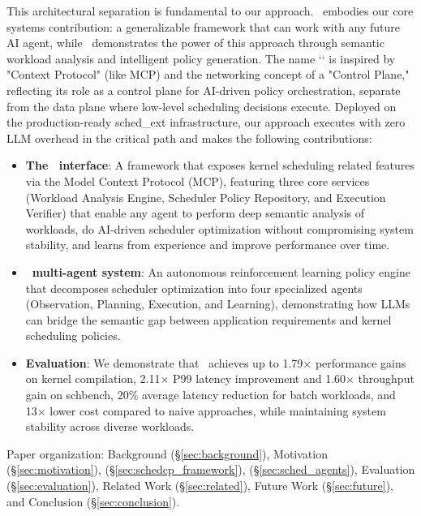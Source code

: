 This architectural separation is fundamental to our approach. \sys\ embodies our core systems contribution: a generalizable framework that can work with any future AI agent, while \agent\ demonstrates the power of this approach through semantic workload analysis and intelligent policy generation. The name `\sys` is inspired by "Context Protocol" (like MCP) and the networking concept of a "Control Plane," reflecting its role as a control plane for AI-driven policy orchestration, separate from the data plane where low-level scheduling decisions execute. Deployed on the production-ready sched\_ext infrastructure, our approach executes with zero LLM overhead in the critical path and makes the following contributions:

\begin{itemize}
    \item \textbf{The \sys\ interface}: A framework that exposes kernel scheduling related features via the Model Context Protocol (MCP), featuring three core services (Workload Analysis Engine, Scheduler Policy Repository, and Execution Verifier) that enable any agent to perform deep semantic analysis of workloads, do AI-driven scheduler optimization without compromising system stability, and learns from experience and improve performance over time.
    \item \textbf{\agent\ multi-agent system}: An autonomous reinforcement learning policy engine that decomposes scheduler optimization into four specialized agents (Observation, Planning, Execution, and Learning), demonstrating how LLMs can bridge the semantic gap between application requirements and kernel scheduling policies.
    \item \textbf{Evaluation}: We demonstrate that \agent\ achieves up to 1.79× performance gains on kernel compilation, 2.11× P99 latency improvement and 1.60× throughput gain on schbench, 20\% average latency reduction for batch workloads, and 13× lower cost compared to naive approaches, while maintaining system stability across diverse workloads.
\end{itemize}

Paper organization: Background (§\ref{sec:background}), Motivation (§\ref{sec:motivation}), \sys (§\ref{sec:schedcp_framework}), \agent (§\ref{sec:sched_agents}), Evaluation (§\ref{sec:evaluation}), Related Work (§\ref{sec:related}), Future Work (§\ref{sec:future}), and Conclusion (§\ref{sec:conclusion}).
